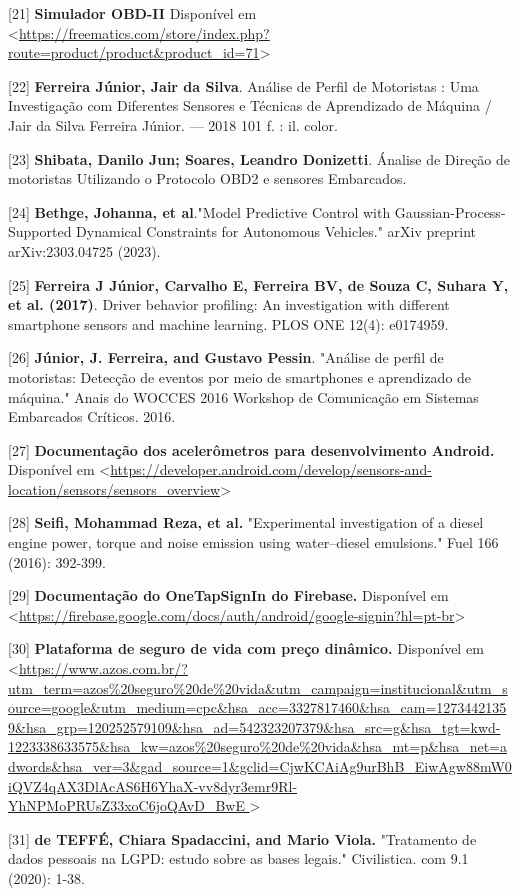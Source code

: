 [21] \textbf{Simulador OBD-II} Disponível em <\url{https://freematics.com/store/index.php?route=product/product&product_id=71}>

[22] \textbf{Ferreira Júnior, Jair da Silva}.
Análise de Perfil de Motoristas : Uma Investigação com Diferentes Sensores e Técnicas de
Aprendizado de Máquina / Jair da Silva Ferreira Júnior. — 2018
101 f. : il. color.

[23] \textbf{Shibata, Danilo Jun; Soares, Leandro Donizetti}. Ánalise de Direção de motoristas Utilizando o Protocolo OBD2 e sensores Embarcados.

[24] \textbf{Bethge, Johanna, et al}."Model Predictive Control with Gaussian-Process-Supported Dynamical Constraints for Autonomous Vehicles." arXiv preprint arXiv:2303.04725 (2023).

[25] \textbf{Ferreira J Júnior, Carvalho E, Ferreira BV, de Souza C, Suhara Y, et al. (2017)}. Driver behavior profiling: An investigation with different smartphone sensors and machine learning. PLOS ONE 12(4): e0174959.

[26] \textbf{Júnior, J. Ferreira, and Gustavo Pessin}. "Análise de perfil de motoristas: Detecção de eventos por meio de smartphones e aprendizado de máquina." Anais do WOCCES 2016 Workshop de Comunicação em Sistemas Embarcados Críticos. 2016.

[27] \textbf{Documentação dos acelerômetros para desenvolvimento Android.} Disponível em <\url{https://developer.android.com/develop/sensors-and-location/sensors/sensors_overview}>

[28] \textbf{Seifi, Mohammad Reza, et al.} "Experimental investigation of a diesel engine power, torque and noise emission using water–diesel emulsions." Fuel 166 (2016): 392-399.

[29] \textbf{Documentação do OneTapSignIn do Firebase.} Disponível em <\url{https://firebase.google.com/docs/auth/android/google-signin?hl=pt-br}>

[30] \textbf{Plataforma de seguro de vida com preço dinâmico.} Disponível em <\url{https://www.azos.com.br/?utm_term=azos%
}>

[31] \textbf{de TEFFÉ, Chiara Spadaccini, and Mario Viola. }"Tratamento de dados pessoais na LGPD: estudo sobre as bases legais." Civilistica. com 9.1 (2020): 1-38.

